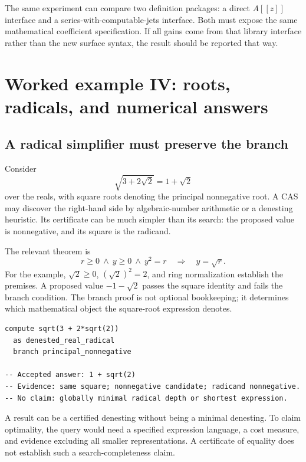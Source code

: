 \documentclass[11pt,a4paper]{article}
\theoremstyle{definition}
\begin{document}
The same experiment can compare two definition packages: a direct \(A[[z]]\) interface and a series-with-computable-jets interface. Both must expose the same mathematical coefficient specification. If all gains come from that library interface rather than the new surface syntax, the result should be reported that way.

\section{Worked example IV: roots, radicals, and numerical answers}\label{sec:roots}

\subsection{A radical simplifier must preserve the branch}
Consider
\[
             \sqrt{3+2\sqrt2}=1+\sqrt2
\]
over the reals, with square roots denoting the principal nonnegative root. A CAS may discover the right-hand side by algebraic-number arithmetic or a denesting heuristic. Its certificate can be much simpler than its search: the proposed value is nonnegative, and its square is the radicand.

The relevant theorem is
\[
 r\ge0\ \land\ y\ge0\ \land\ y^2=r
      \quad\Longrightarrow\quad y=\sqrt r.
\]
For the example, \(\sqrt2\ge0\), \((\sqrt2)^2=2\), and ring normalization establish the premises. A proposed value \(-1-\sqrt2\) passes the square identity and fails the branch condition. The branch proof is not optional bookkeeping; it determines which mathematical object the square-root expression denotes.

\par\noindent\begin{minipage}{\linewidth}
\begin{lstlisting}
compute sqrt(3 + 2*sqrt(2))
  as denested_real_radical
  branch principal_nonnegative

-- Accepted answer: 1 + sqrt(2)
-- Evidence: same square; nonnegative candidate; radicand nonnegative.
-- No claim: globally minimal radical depth or shortest expression.
\end{lstlisting}
\end{minipage}\par

A result can be a certified denesting without being a minimal denesting. To claim optimality, the query would need a specified expression language, a cost measure, and evidence excluding all smaller representations. A certificate of equality does not establish such a search-completeness claim.
\end{document}
